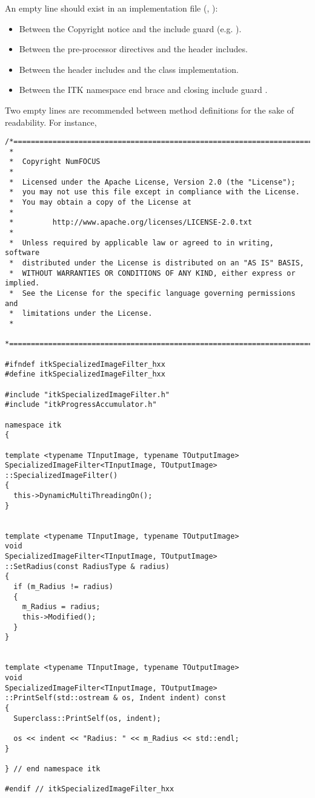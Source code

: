 An empty line should exist in an implementation file (, ):
\begin{itemize}
\item Between the Copyright notice and the include guard (e.g.
).
\item Between the pre-processor directives and the header includes.
\item Between the header includes and the class implementation.
\item Between the ITK namespace end brace  and
closing include guard .
\end{itemize}

Two empty lines are recommended between method definitions for the sake of
readability.
For instance,

\small
\begin{verbatim}
/*=========================================================================
 *
 *  Copyright NumFOCUS
 *
 *  Licensed under the Apache License, Version 2.0 (the "License");
 *  you may not use this file except in compliance with the License.
 *  You may obtain a copy of the License at
 *
 *         http://www.apache.org/licenses/LICENSE-2.0.txt
 *
 *  Unless required by applicable law or agreed to in writing, software
 *  distributed under the License is distributed on an "AS IS" BASIS,
 *  WITHOUT WARRANTIES OR CONDITIONS OF ANY KIND, either express or implied.
 *  See the License for the specific language governing permissions and
 *  limitations under the License.
 *
 *=========================================================================*/

#ifndef itkSpecializedImageFilter_hxx
#define itkSpecializedImageFilter_hxx

#include "itkSpecializedImageFilter.h"
#include "itkProgressAccumulator.h"

namespace itk
{

template <typename TInputImage, typename TOutputImage>
SpecializedImageFilter<TInputImage, TOutputImage>
::SpecializedImageFilter()
{
  this->DynamicMultiThreadingOn();
}


template <typename TInputImage, typename TOutputImage>
void
SpecializedImageFilter<TInputImage, TOutputImage>
::SetRadius(const RadiusType & radius)
{
  if (m_Radius != radius)
  {
    m_Radius = radius;
    this->Modified();
  }
}


template <typename TInputImage, typename TOutputImage>
void
SpecializedImageFilter<TInputImage, TOutputImage>
::PrintSelf(std::ostream & os, Indent indent) const
{
  Superclass::PrintSelf(os, indent);

  os << indent << "Radius: " << m_Radius << std::endl;
}

} // end namespace itk

#endif // itkSpecializedImageFilter_hxx
\end{verbatim}
\normalsize

